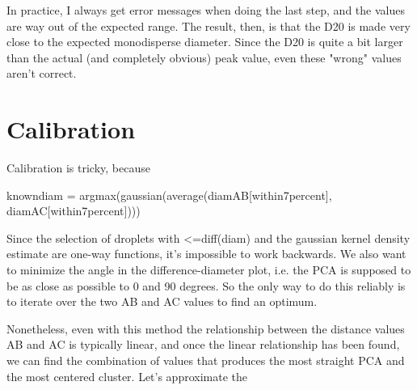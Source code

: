 \documentclass[10pt]{book}
\begin{document}
In practice, I always get error messages when doing the last step, and the
values are way out of the expected range. The result, then, is that the D20 is
made very close to the expected monodisperse diameter. Since the D20 is quite
a bit larger than the actual (and completely obvious) peak value, even these
"wrong" values aren't correct.

\section{Calibration}
Calibration is tricky, because 

knowndiam = argmax(gaussian(average(diamAB[within7percent], diamAC[within7percent])))

Since the selection of droplets with <=diff(diam) and the gaussian kernel
density estimate are one-way functions, it's impossible to work backwards. We
also want to minimize the angle in the difference-diameter plot, i.e. the PCA is
supposed to be as close as possible to 0 and 90 degrees. So the only way to do
this reliably is to iterate over the two AB and AC values to find an optimum.

Nonetheless, even with this method the relationship between the distance values
AB and AC is typically linear, and once the linear relationship has been found,
we can find the combination of values that produces the most straight PCA and
the most centered cluster. Let's approximate the 





\end{document}

